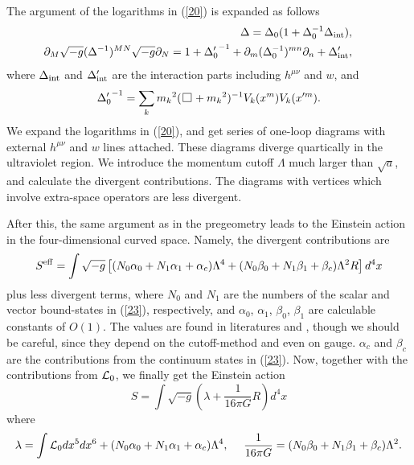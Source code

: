 \documentclass[a4paper,12pt]{article}
\begin{document}
The argument of the logarithms in (\ref{20}) is expanded as follows
\begin{eqnarray}
&&\hskip-10mm
\Delta=\Delta_0(1+\Delta_0^{-1}\Delta_{\rm int}),
  \label{24}  \\
&&\hskip-10mm
\partial_M\sqrt{-g}(\Delta^{-1})^{MN}\sqrt{-g}\partial_N
=1+{\Delta'_0}^{-1}
+\partial_m(\Delta_0^{-1})^{mn}\partial_n+\Delta'_{\rm int},
  \label{25}  \end{eqnarray}
where $\Delta_{\rm int}$ and $\Delta'_{\rm int}$ are the interaction parts
including $h^{\mu\nu}$ and $w$, and
\begin{equation}
{\Delta'_0}^{-1}=\sum_k {m_k}^2(\,\framebox(7,7){}\,+{m_k}^2)^{-1}V_k(x^m)V_k(x'^m).
  \label{26}  \end{equation}
We expand the logarithms in (\ref{20}), and get series of one-loop diagrams
with external $h^{\mu\nu}$ and $w$ lines attached.
These diagrams diverge quartically in the ultraviolet region.
We introduce the momentum cutoff $\Lambda$ much larger than $\sqrt{a}$,
and calculate the divergent contributions. The diagrams with vertices which involve
extra-space operators are less divergent.

After this, the same argument as in the pregeometry \cite{1} leads to the Einstein
action in the four-dimensional curved space. 
Namely, the divergent contributions are
\begin{equation}
S^{\rm eff} = \int\sqrt{-g}\left[
(N_0\alpha_0+N_1\alpha_1+\alpha_c)\Lambda^4+
(N_0\beta_0+N_1\beta_1+\beta_c)\Lambda^2R\right]
d^4x
  \label{27}  \end{equation}
plus less divergent terms, where $N_0$ and $N_1$ are the numbers of the scalar
and vector bound-states in (\ref{23}), respectively,
and $\alpha_0$, $\alpha_1$, $\beta_0$, $\beta_1$ are calculable constants of $O(1)$.
The values are found in literatures \cite{1} and \cite{4},
though we should be careful, since they depend on the cutoff-method and even on gauge.
$\alpha_c$ and $\beta_c$ are the contributions from the continuum states in (\ref{23}).
Now, together with the contributions from ${\cal L}_0$, 
we finally get the Einstein action
\begin{equation}
S = \int\sqrt{-g}\left(\lambda + \frac{1}{16\pi G}R\right)d^4x
  \label{28}  \end{equation}
where
\begin{equation}
\lambda = \int{\cal L}_0 dx^5 dx^6 + (N_0\alpha_0+N_1\alpha_1+\alpha_c)\Lambda^4,
\ \ \ \ 
\frac{1}{16\pi G}=(N_0\beta_0+N_1\beta_1+\beta_c)\Lambda^2.
  \label{29}  \end{equation}
\end{document}
